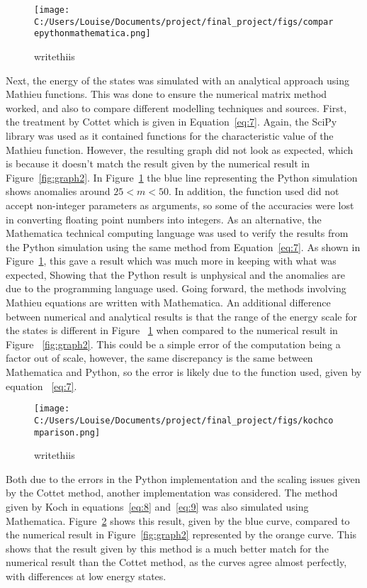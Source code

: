 \documentclass[11pt]{article}
\begin{document}
\begin{figure}[ht]
\centering
\texttt{[image: C:/Users/Louise/Documents/project/final\_project/figs/comparepythonmathematica.png]}
\caption{writethiis}
\label{fig:graph3}
\end{figure}
Next, the energy of the states was simulated with an analytical approach using Mathieu functions. This was done to ensure the numerical matrix method worked, and also to compare different modelling techniques and sources. First, the treatment by Cottet which is given in Equation~\ref{eq:7}. Again, the SciPy library was used as it contained functions for the characteristic value of the Mathieu function. However, the resulting graph did not look as expected, which is because it doesn't match the result given by the numerical result in Figure~\ref{fig:graph2}. In Figure~\ref{fig:graph3} the blue line representing the Python simulation shows anomalies around $25 < m < 50$. In addition, the function used did not accept non-integer parameters as arguments, so some of the accuracies were lost in converting floating point numbers into integers. As an alternative, the Mathematica technical computing language was used to verify the results from the Python simulation using the same method from Equation~\ref{eq:7}. As shown in Figure~\ref{fig:graph3}, this gave a result which was much more in keeping with what was expected, Showing that the Python result is unphysical and the anomalies are due to the programming language used. Going forward, the methods involving Mathieu equations are written with Mathematica.
An additional difference between numerical and analytical results is that the range of the energy scale for the states is different in Figure ~\ref{fig:graph3} when compared to the numerical result in Figure ~\ref{fig:graph2}. This could be a simple error of the computation being a factor out of scale, however, the same discrepancy is the same between Mathematica and Python, so the error is likely due to the function used, given by equation ~\ref{eq:7}.
\begin{figure}[ht]
\centering
\texttt{[image: C:/Users/Louise/Documents/project/final\_project/figs/kochcomparison.png]}
\caption{writethiis}
\label{fig:graph4}
\end{figure}

Both due to the errors in the Python implementation and the scaling issues given by the Cottet method, another implementation was considered. The method given by Koch in equations~\ref{eq:8} and~\ref{eq:9} was also simulated using Mathematica. Figure~\ref{fig:graph4} shows this result, given by the blue curve, compared to the numerical result in Figure~\ref{fig:graph2} represented by the orange curve. This shows that the result given by this method is a much better match for the numerical result than the Cottet method, as the curves agree almost perfectly, with differences at low energy states.
\end{document}
